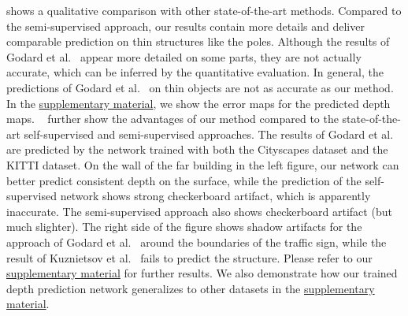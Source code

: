 \documentclass[runningheads]{llncs}
\begin{document}
shows a qualitative comparison with other 
state-of-the-art methods. Compared to the 
semi-supervised approach, 
our results contain more details and deliver
comparable prediction on thin structures like the poles.
Although the results of Godard et 
al.~\cite{godard2016unsupervised} 
appear more detailed on some parts, they are 
not actually accurate, which can be inferred by the quantitative 
evaluation. In general, the predictions of Godard et 
al.~\cite{godard2016unsupervised} on 
thin objects are not as accurate as our method. In the 
\href{https://vision.in.tum.de/_media/spezial/bib/yang2018dvso-supp.pdf}{supplementary
	material}, we show the error
maps for the predicted depth maps.
~ further show 
the advantages of our method compared to the 
state-of-the-art self-supervised and semi-supervised
approaches. The results of Godard et 
al.~\cite{godard2016unsupervised} are 
predicted by the network trained with both 
the Cityscapes dataset and the KITTI dataset.
On the wall of the far building 
in the left figure, our network can 
better predict consistent depth on the 
surface, while the prediction of the 
self-supervised network shows strong checkerboard 
artifact, which is apparently inaccurate. The 
semi-supervised approach also shows checkerboard artifact (but much slighter). 
The right side of the figure shows shadow artifacts for the approach of Godard et al.~\cite{godard2016unsupervised} around the boundaries of the traffic 
sign, while the result of Kuznietsov et al.~\cite{kuznietsov2017semi} fails to predict the structure. 
Please refer to our 
\href{https://vision.in.tum.de/_media/spezial/bib/yang2018dvso-supp.pdf}{supplementary
	material} for further results.
We also demonstrate how our trained depth prediction network generalizes to 
other datasets in the 
\href{https://vision.in.tum.de/_media/spezial/bib/yang2018dvso-supp.pdf}{supplementary
	material}.
\end{document}
